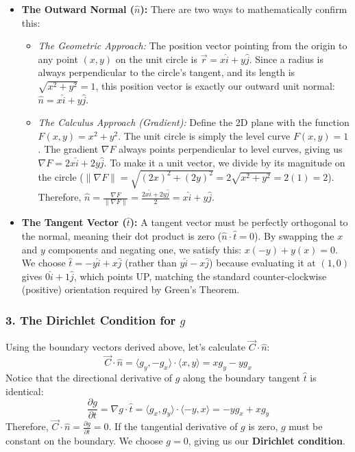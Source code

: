 \documentclass[11pt]{article}
\begin{document}
\begin{itemize}
    \item \textbf{The Outward Normal ($\hat{n}$):} There are two ways to mathematically confirm this:
    \begin{itemize}
        \item \textit{The Geometric Approach:} The position vector pointing from the origin to any point $(x,y)$ on the unit circle is $\vec{r} = x\hat{i} + y\hat{j}$. Since a radius is always perpendicular to the circle's tangent, and its length is $\sqrt{x^2+y^2} = 1$, this position vector is exactly our outward unit normal: $\hat{n} = x\hat{i} + y\hat{j}$.
        \item \textit{The Calculus Approach (Gradient):} Define the 2D plane with the function $F(x,y) = x^2 + y^2$. The unit circle is simply the level curve $F(x,y) = 1$. The gradient $\nabla F$ always points perpendicular to level curves, giving us $\nabla F = 2x\hat{i} + 2y\hat{j}$. To make it a unit vector, we divide by its magnitude on the circle ($\|\nabla F\| = \sqrt{(2x)^2+(2y)^2} = 2\sqrt{x^2+y^2} = 2(1) = 2$). Therefore, $\hat{n} = \frac{\nabla F}{\|\nabla F\|} = \frac{2x\hat{i} + 2y\hat{j}}{2} = x\hat{i} + y\hat{j}$.
    \end{itemize}
    \item \textbf{The Tangent Vector ($\hat{t}$):} A tangent vector must be perfectly orthogonal to the normal, meaning their dot product is zero ($\hat{n} \cdot \hat{t} = 0$). By swapping the $x$ and $y$ components and negating one, we satisfy this: $x(-y) + y(x) = 0$. We choose $\hat{t} = -y\hat{i} + x\hat{j}$ (rather than $y\hat{i} - x\hat{j}$) because evaluating it at $(1,0)$ gives $0\hat{i} + 1\hat{j}$, which points UP, matching the standard counter-clockwise (positive) orientation required by Green's Theorem.
\end{itemize}

\subsubsection*{3. The Dirichlet Condition for $g$}
Using the boundary vectors derived above, let's calculate $\vec{C} \cdot \hat{n}$:
\[ \vec{C} \cdot \hat{n} = \langle g_y, -g_x \rangle \cdot \langle x, y \rangle = x g_y - y g_x \]
Notice that the directional derivative of $g$ along the boundary tangent $\hat{t}$ is identical:
\[ \frac{\partial g}{\partial t} = \nabla g \cdot \hat{t} = \langle g_x, g_y \rangle \cdot \langle -y, x \rangle = -y g_x + x g_y \]
Therefore, $\vec{C} \cdot \hat{n} = \frac{\partial g}{\partial t} = 0$. If the tangential derivative of $g$ is zero, $g$ must be constant on the boundary. We choose $g = 0$, giving us our \textbf{Dirichlet condition}.
\end{document}
